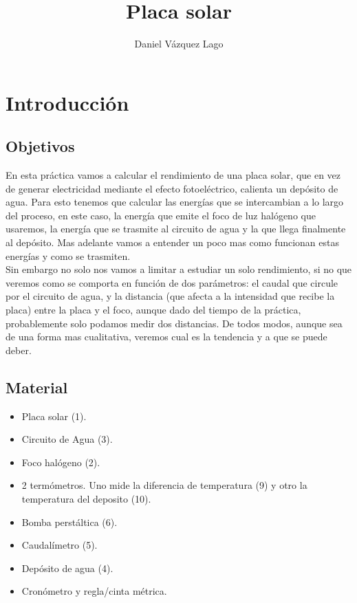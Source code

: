 \documentclass[12pt,a4paper]{article}
\author{Daniel Vázquez Lago}
\title{Placa solar}
\begin{document}
\maketitle

\newpage

\tableofcontents

\newpage

\section{Introducción}

\subsection{Objetivos}

En esta práctica vamos a calcular el rendimiento de una placa solar, que en vez de generar electricidad mediante el efecto fotoeléctrico, calienta un depósito de agua. Para esto tenemos que calcular las energías que se intercambian a lo largo del proceso, en este caso, la energía que emite el foco de luz halógeno que usaremos, la energía que se trasmite al circuito de agua y la que llega finalmente al depósito. Mas adelante vamos a entender un poco mas como funcionan estas energías y como se trasmiten. \\

Sin embargo no solo nos vamos a limitar a estudiar un solo rendimiento, si no que veremos como se comporta en función de dos parámetros: el caudal que circule por el circuito de agua, y la distancia (que afecta a la intensidad que recibe la placa) entre la placa y el foco, aunque dado del tiempo de la práctica, probablemente solo podamos medir dos distancias. De todos modos, aunque sea de una forma mas cualitativa, veremos cual es la tendencia y a que se puede deber.

\subsection{Material}

\begin{itemize}
\item Placa solar (1).
\item Circuito de Agua (3). 
\item Foco halógeno (2).
\item 2 termómetros. Uno mide la diferencia de temperatura (9) y otro la temperatura del deposito (10). 
\item Bomba perstáltica (6).
\item Caudalímetro (5).
\item Depósito de agua (4).
\item Cronómetro y regla/cinta métrica.
\end{itemize}
\end{document}
